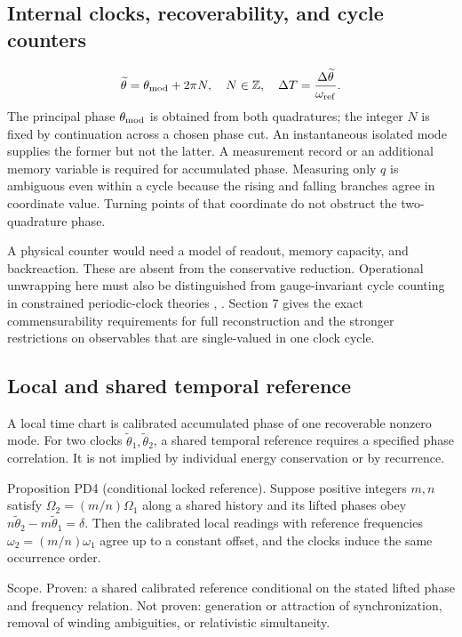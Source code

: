 \documentclass[aip,adv,preprint,floatfix]{revtex4-2}
\begin{document}
\subsection*{Internal clocks, recoverability, and cycle counters}
\begin{equation}
\widetilde\theta=\theta_{\rm mod}+2\pi N,\quad N\in\mathbb{Z},\quad\Delta T=\frac{\Delta\widetilde\theta}{\omega_{\rm ref}}.
\end{equation}
The principal phase $\theta_{\rm mod}$ is obtained from both quadratures; the integer $N$ is fixed by continuation across a chosen phase cut. An instantaneous isolated mode supplies the former but not the latter. A measurement record or an additional memory variable is required for accumulated phase. Measuring only $q$ is ambiguous even within a cycle because the rising and falling branches agree in coordinate value. Turning points of that coordinate do not obstruct the two-quadrature phase.

A physical counter would need a model of readout, memory capacity, and backreaction. These are absent from the conservative reduction. Operational unwrapping here must also be distinguished from gauge-invariant cycle counting in constrained periodic-clock theories \cite{r9}, \cite{r10}. Section 7 gives the exact commensurability requirements for full reconstruction and the stronger restrictions on observables that are single-valued in one clock cycle.

\subsection*{Local and shared temporal reference}
A local time chart is calibrated accumulated phase of one recoverable nonzero mode. For two clocks $\widetilde\theta_1,\widetilde\theta_2$, a shared temporal reference requires a specified phase correlation. It is not implied by individual energy conservation or by recurrence.

Proposition PD4 (conditional locked reference). Suppose positive integers $m,n$ satisfy $\Omega_2=(m/n)\Omega_1$ along a shared history and its lifted phases obey $n\widetilde\theta_2-m\widetilde\theta_1=\delta$. Then the calibrated local readings with reference frequencies $\omega_2=(m/n)\omega_1$ agree up to a constant offset, and the clocks induce the same occurrence order.

Scope. Proven: a shared calibrated reference conditional on the stated lifted phase and frequency relation. Not proven: generation or attraction of synchronization, removal of winding ambiguities, or relativistic simultaneity.
\end{document}
